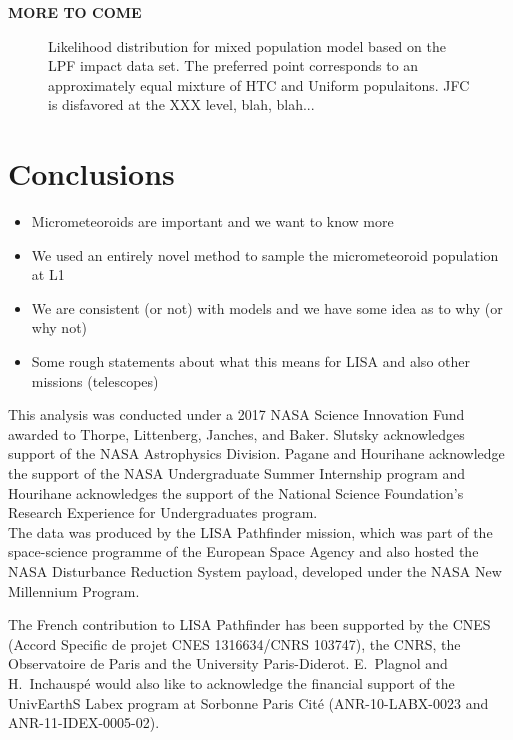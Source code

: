 \documentclass[preprint, trackchanges]{aastex61}
\begin{document}
\textbf{MORE TO COME}


\begin{figure}
\caption{Likelihood distribution for mixed population model based on the LPF impact data set. The preferred point corresponds to an approximately equal mixture of HTC and Uniform populaitons.  JFC is disfavored at the XXX level, blah, blah...\label{fig:Example}}
\end{figure}
\FloatBarrier
\section{Conclusions} \label{sec:conclusions}

\begin{itemize}
\item Micrometeoroids are important and we want to know more
\item We used an entirely novel method to sample the micrometeoroid population at L1
\item We are consistent (or not) with models and we have some idea as to why (or why not)
\item Some rough statements about what this means for LISA  and also other missions (telescopes)
\end{itemize}
\acknowledgments

This analysis was conducted under a 2017 NASA Science Innovation Fund awarded to Thorpe, Littenberg, Janches, and Baker. Slutsky acknowledges support of the NASA Astrophysics Division. Pagane and Hourihane acknowledge the support of the NASA Undergraduate Summer Internship program and Hourihane acknowledges the support of the National Science Foundation's Research Experience for Undergraduates program.
\\

The data was produced by the LISA Pathfinder mission, which was part of the
space-science programme of the European Space Agency and also hosted the NASA Disturbance Reduction System payload, developed under the NASA New Millennium Program. 

The French contribution to LISA Pathfinder has been supported by the CNES (Accord Specific de projet
CNES 1316634/CNRS 103747), the CNRS, the Observatoire de Paris and the University
Paris-Diderot. E.~Plagnol and H.~Inchausp\'{e} would also like to acknowledge the
financial support of the UnivEarthS Labex program at Sorbonne Paris Cit\'{e}
(ANR-10-LABX-0023 and ANR-11-IDEX-0005-02).
\end{document}
